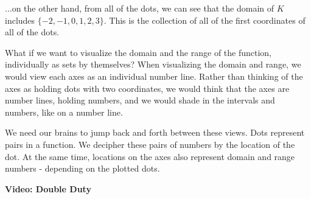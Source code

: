 \documentclass{ximera}
\begin{document}
...on the other hand, from all of the dots, we can see that the domain of $K$ includes $\{ -2, -1, 0, 1, 2, 3 \}$.  This is the collection of all of the first coordinates of all of the dots.


What if we want to visualize the domain and the range of the function, individually as sets by themselves?  When visualizing the domain and range, we would view each axes as an individual number line.  Rather than thinking of the axes as holding dots with two coordinates, we would think that the axes are number lines, holding numbers, and we would shade in the intervals and numbers, like on a number line.

We need our brains to jump back and forth between these views.  Dots represent pairs in a function.  We decipher these pairs of numbers by the location of the dot.  At the same time, locations on the axes also represent domain and range numbers - depending on the plotted dots.






\begin{explanation} \textbf{\textcolor{red!75!green}{Video: Double Duty}}

\begin{onlineOnly}
\begin{expandable} 

\begin{center}
\end{center}

\end{expandable}
\end{onlineOnly}

\end{explanation}
\end{document}
